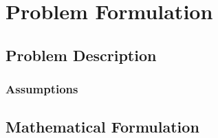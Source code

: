 \documentclass[main.tex]{subfiles}
\begin{document}
  \chapter{Problem Formulation}
  \section{Problem Description}

  \subsection{Assumptions}

  \section{Mathematical Formulation}
\end{document}
